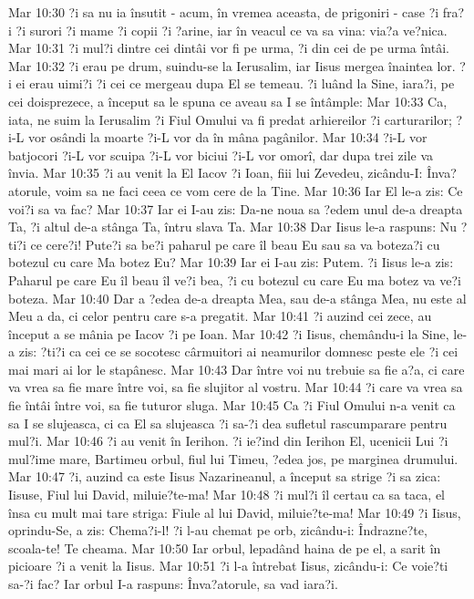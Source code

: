 Mar 10:30  ?i sa nu ia însutit - acum, în vremea aceasta, de prigoniri - case ?i fra?i ?i surori ?i mame ?i copii ?i ?arine, iar în veacul ce va sa vina: via?a ve?nica.
Mar 10:31  ?i mul?i dintre cei dintâi vor fi pe urma, ?i din cei de pe urma întâi.
Mar 10:32  ?i erau pe drum, suindu-se la Ierusalim, iar Iisus mergea înaintea lor. ?i ei erau uimi?i ?i cei ce mergeau dupa El se temeau. ?i luând la Sine, iara?i, pe cei doisprezece, a început sa le spuna ce aveau sa I se întâmple:
Mar 10:33  Ca, iata, ne suim la Ierusalim ?i Fiul Omului va fi predat arhiereilor ?i carturarilor; ?i-L vor osândi la moarte ?i-L vor da în mâna pagânilor.
Mar 10:34  ?i-L vor batjocori ?i-L vor scuipa ?i-L vor biciui ?i-L vor omorî, dar dupa trei zile va învia.
Mar 10:35  ?i au venit la El Iacov ?i Ioan, fiii lui Zevedeu, zicându-I: Înva?atorule, voim sa ne faci ceea ce vom cere de la Tine.
Mar 10:36  Iar El le-a zis: Ce voi?i sa va fac?
Mar 10:37  Iar ei I-au zis: Da-ne noua sa ?edem unul de-a dreapta Ta, ?i altul de-a stânga Ta, întru slava Ta.
Mar 10:38  Dar Iisus le-a raspuns: Nu ?ti?i ce cere?i! Pute?i sa be?i paharul pe care îl beau Eu sau sa va boteza?i cu botezul cu care Ma botez Eu?
Mar 10:39  Iar ei I-au zis: Putem. ?i Iisus le-a zis: Paharul pe care Eu îl beau îl ve?i bea, ?i cu botezul cu care Eu ma botez va ve?i boteza.
Mar 10:40  Dar a ?edea de-a dreapta Mea, sau de-a stânga Mea, nu este al Meu a da, ci celor pentru care s-a pregatit.
Mar 10:41  ?i auzind cei zece, au început a se mânia pe Iacov ?i pe Ioan.
Mar 10:42  ?i Iisus, chemându-i la Sine, le-a zis: ?ti?i ca cei ce se socotesc cârmuitori ai neamurilor domnesc peste ele ?i cei mai mari ai lor le stapânesc.
Mar 10:43  Dar între voi nu trebuie sa fie a?a, ci care va vrea sa fie mare între voi, sa fie slujitor al vostru.
Mar 10:44  ?i care va vrea sa fie întâi între voi, sa fie tuturor sluga.
Mar 10:45  Ca ?i Fiul Omului n-a venit ca sa I se slujeasca, ci ca El sa slujeasca ?i sa-?i dea sufletul rascumparare pentru mul?i.
Mar 10:46  ?i au venit în Ierihon. ?i ie?ind din Ierihon El, ucenicii Lui ?i mul?ime mare, Bartimeu orbul, fiul lui Timeu, ?edea jos, pe marginea drumului.
Mar 10:47  ?i, auzind ca este Iisus Nazarineanul, a început sa strige ?i sa zica: Iisuse, Fiul lui David, miluie?te-ma!
Mar 10:48  ?i mul?i îl certau ca sa taca, el însa cu mult mai tare striga: Fiule al lui David, miluie?te-ma!
Mar 10:49  ?i Iisus, oprindu-Se, a zis: Chema?i-l! ?i l-au chemat pe orb, zicându-i: Îndrazne?te, scoala-te! Te cheama.
Mar 10:50  Iar orbul, lepadând haina de pe el, a sarit în picioare ?i a venit la Iisus.
Mar 10:51  ?i l-a întrebat Iisus, zicându-i: Ce voie?ti sa-?i fac? Iar orbul I-a raspuns: Înva?atorule, sa vad iara?i.
